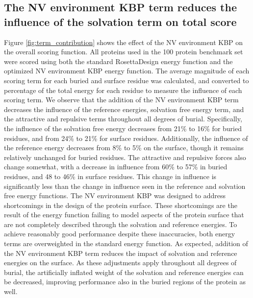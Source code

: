 \subsection{The \acs{NV} environment \acs{KBP} term reduces the influence of the solvation term on total score}
Figure \ref{fig:term_contribution} shows the effect of the \ac{NV} environment \ac{KBP} on the overall scoring function.
All proteins used in the 100 protein benchmark set were scored using both the standard RosettaDesign energy function and the optimized \ac{NV} environment \ac{KBP} energy function. 
The average magnitude of each scoring term for each buried and surface residue was calculated, and converted to percentage of the total energy for each residue to measure the influence of each scoring term.
We observe that the addition of the \ac{NV} environment \ac{KBP} term decreases the influence of the reference energies, solvation free energy term, and the attractive and repulsive terms throughout all degrees of burial.
Specifically, the influence of the solvation free energy decreases from 21\% to 16\% for buried residues, and from 24\% to 21\% for surface residues.
Additionally, the influence of the reference energy decreases from 8\% to 5\% on the surface, though it remains relatively unchanged for buried residues.
The attractive and repulsive forces also change somewhat, with a decrease in influence from 60\% to 57\% in buried residues, and 48 to 46\% in surface residues.
This change in influence is significantly less than the change in influence seen in the reference and solvation free energy functions.
The \ac{NV} environment \ac{KBP} was designed to address shortcomings in the design of the protein surface.
These shortcomings are the result of the energy function failing to model aspects of the protein surface that are not completely described through the solvation and reference energies.
To achieve reasonably good performance despite these inaccuracies, both energy terms are overweighted in the standard energy function.
As expected, addition of the \ac{NV} environment \ac{KBP} term reduces the impact of solvation and reference energies on the surface.
As these adjustments apply throughout all degrees of burial, the artificially inflated weight of the solvation and reference energies can be decreased, improving performance also in the buried regions of the protein as well.


